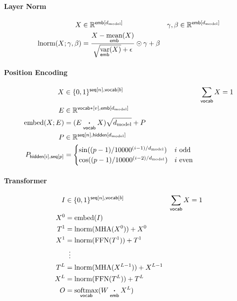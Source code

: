 \documentclass{article}
\newcommand{\reals}[0]{\mathbb{R}}
\newcommand{\dmodel}{d_{\text{model}}}
\begin{document}
\paragraph{Layer Norm}

\begin{align*} 
X &\in \reals^{\nset{emb}{\dmodel}} & \gamma, \beta &\in \reals^{\nset{emb}{\dmodel}} \\
\text{lnorm}(X; \gamma, \beta) &= \frac{X - \nfun{emb}{\text{mean}}(X)}{\sqrt{\nfun{emb}{\text{var}}(X)} + \epsilon} \odot \gamma + \beta 
\end{align*}

\paragraph{Position Encoding}
\begin{align*} 
X &\in \{0, 1\}^{\nset{seq}{n}, \nset{vocab}{b}} & \nsum{vocab} X &= 1\\
E &\in \reals^{\nset{vocab*}{v}, \nset{emb}{\dmodel}} \\
\text{embed}(X; E) &= (E \ndot{vocab} X)\sqrt{\dmodel} + P \\
P &\in \reals^{\nset{seq}{n}, \nset{hidden}{\dmodel}} \\
P_{\nidx{hidden}{i}, \nidx{seq}{p}} &= \begin{cases}
  \sin((p-1) / 10000^{(i-1) / \dmodel}) & \text{$i$ odd} \\ 
  \cos((p-1) / 10000^{(i-2) / \dmodel}) & \text{$i$ even} \\
\end{cases} \\
\end{align*}

\paragraph{Transformer}

\begin{align*} 
I &\in \{0, 1\}^{{\nset{seq}{n}, \nset{vocab}{b}}} & \nsum{vocab} X &= 1\\
X^0 &= \text{embed}(I)\\
T^1 &= \text{lnorm}(\text{MHA}(X^0)) + X^0\\
X^1 &= \text{lnorm}(\text{FFN}(T^1)) + T^1\\
&\vdotswithin{=} \\
T^{L} &= \text{lnorm}(\text{MHA}(X^{L-1})) + X^{L-1}\\
X^{L} &= \text{lnorm}(\text{FFN}(T^L)) + T^L\\
O &= \nfun{vocab}{softmax}(W \ndot{emb} X^L)
\end{align*}


\end{document}
